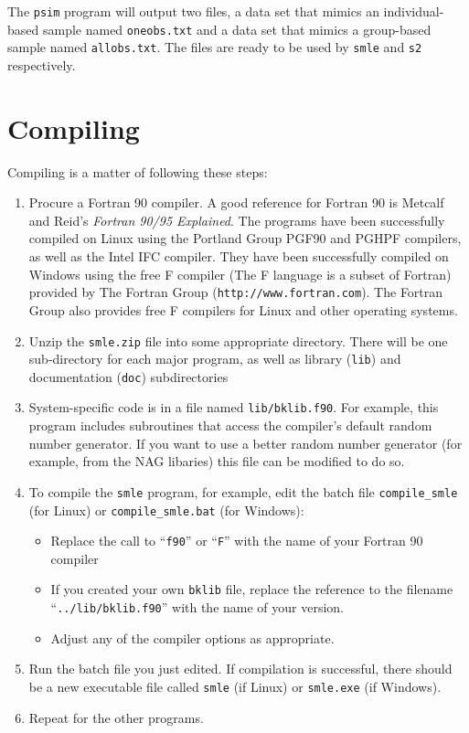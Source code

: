 \documentclass{article}
\begin{document}
The {\tt psim} program will output two files, a data set that mimics an individual-based
sample named {\tt oneobs.txt} and a data set that mimics a group-based sample named
{\tt allobs.txt}.  The files are ready to be used by {\tt smle} and {\tt s2} respectively.

\appendix

\section{Compiling}\label{sec:compiling}

Compiling is a matter of following these steps:
\begin{enumerate}
\item Procure a Fortran 90 compiler. A good reference for Fortran 90 is 
	Metcalf and Reid's {\it Fortran 90/95 Explained}.  The programs have been 
	successfully compiled on Linux using the Portland Group PGF90 and 
	PGHPF compilers, as well as the Intel IFC compiler.  They have been successfully
	compiled on Windows using the free F compiler (The F language is a subset of 
	Fortran) provided by The Fortran Group ({\tt http://www.fortran.com}).  
	The Fortran Group also provides free F compilers for Linux and other
	operating systems.
\item Unzip the {\tt smle.zip} file into some appropriate directory.
	There will be one sub-directory for each major program, as well as 
	library ({\tt lib}) and documentation ({\tt doc}) subdirectories
\item System-specific code is in a file named {\tt lib/bklib.f90}.
  For example, this program includes subroutines that access the 
  compiler's default random number generator.  If you want to 
  use a better random number generator (for example, from the NAG libaries)
  this file can be modified to do so.
\item To compile the {\tt smle} program, for example, 
	edit the batch file {\tt compile\_{}smle} (for Linux) or {\tt compile\_smle.bat} (for Windows):
	\begin{itemize}
		\item Replace the call to ``{\tt f90}'' or ``{\tt F}'' with the name of your Fortran 90 compiler
		\item If you created your own {\tt bklib} file, replace the 
			reference to the filename ``{\tt ../lib/bklib.f90}'' with the name of your version.
		\item Adjust any of the compiler options as appropriate.
	\end{itemize}
\item Run the batch file you just edited.  If compilation is successful, there should be
	a new executable file called {\tt smle} (if Linux) or {\tt smle.exe} (if Windows).
\item Repeat for the other programs.
\end{enumerate}
\end{document}
